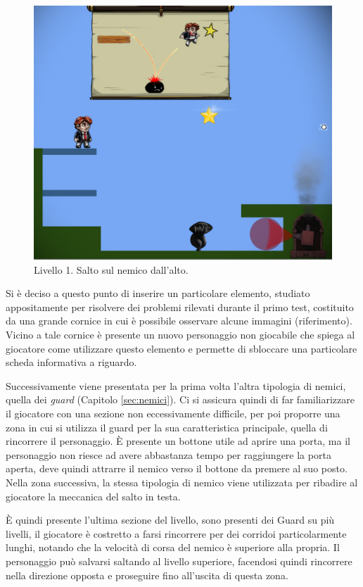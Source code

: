 \begin{figure}%
	\centering
	\includegraphics[width= 0.6\columnwidth]{images/gameDesign/47_salto_alto.jpg}
	\caption{Livello 1. Salto sul nemico dall'alto.}
	\label{fig:livello1_salto_alto}
\end{figure}

Si è deciso a questo punto di inserire un particolare elemento, studiato appositamente per risolvere dei problemi rilevati durante il primo test, costituito da una grande cornice in cui è possibile osservare alcune immagini (riferimento). Vicino a tale cornice è presente un nuovo personaggio non giocabile che spiega al giocatore come utilizzare questo elemento e permette di sbloccare una particolare scheda informativa a riguardo.

Successivamente viene presentata per la prima volta l’altra tipologia di nemici, quella dei \textit{guard} (Capitolo \ref{sec:nemici}). Ci si assicura quindi di far familiarizzare il giocatore con una sezione non eccessivamente difficile, per poi proporre una zona in cui si utilizza il guard per la sua caratteristica principale, quella di rincorrere il personaggio. È presente un bottone utile ad aprire una porta, ma il personaggio non riesce ad avere abbastanza tempo per raggiungere la porta aperta, deve quindi attrarre il nemico verso il bottone da premere al suo posto. Nella zona successiva, la stessa tipologia di nemico viene utilizzata per ribadire al giocatore la meccanica del salto in testa. 

È quindi presente l’ultima sezione del livello, sono presenti dei Guard su più livelli, il giocatore è costretto a farsi rincorrere per dei corridoi particolarmente lunghi, notando che la velocità di corsa del nemico è superiore alla propria. Il personaggio può salvarsi saltando al livello superiore, facendosi quindi rincorrere nella direzione opposta e proseguire fino all’uscita di questa zona.

